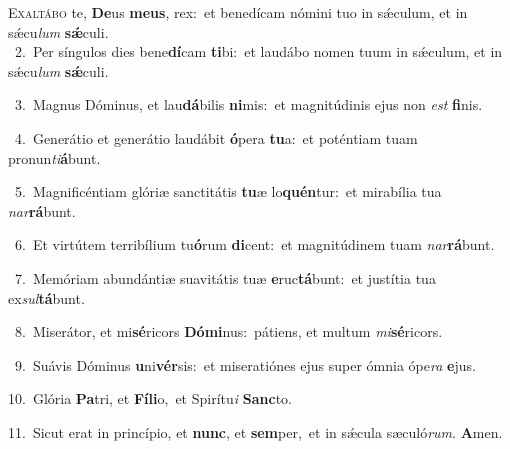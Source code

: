 \lettrine{\initial\textcolor{\initialcolor}{E}}{xaltábo} te, \textbf{De}\-us \textbf{me}\-\textbf{us}, rex:~\star et benedícam nómini tuo in sǽculum, et in sǽcu\textit{lum} \textbf{sǽ}\-culi.\\
{\numbfont\textcolor{\numbcolor}{~2.}}~Per síngulos dies bene\-\textbf{dí}\-cam \textbf{ti}\-bi:~\star et laudábo nomen tuum in sǽculum, et in sǽcu\textit{lum} \textbf{sǽ}\-culi.\par
{\numbfont\textcolor{\numbcolor}{~3.}}~Magnus Dóminus, et lau\-\textbf{dá}\-bilis \textbf{ni}\-mis:~\star et magnitúdinis ejus non \textit{est} \textbf{fi}\-nis.\par
{\numbfont\textcolor{\numbcolor}{~4.}}~Generátio et generátio laudábit \textbf{ó}\-pera \textbf{tu}\-a:~\star et poténtiam tuam pronun\-\textit{ti}\-\textbf{á}bunt.\par
{\numbfont\textcolor{\numbcolor}{~5.}}~Magnificéntiam glóriæ sanctitátis \textbf{tu}\-æ lo\-\textbf{quén}\-tur:~\star et mirabília tua \textit{nar}\-\textbf{rá}bunt.\par
{\numbfont\textcolor{\numbcolor}{~6.}}~Et virtútem terribílium tu\-\textbf{ó}\-rum \textbf{di}\-cent:~\star et magnitúdinem tuam \textit{nar}\-\textbf{rá}bunt.\par
{\numbfont\textcolor{\numbcolor}{~7.}}~Memóriam abundántiæ suavitátis tuæ \textbf{e}\-ruc\-\textbf{tá}\-bunt:~\star et justítia tua ex\-\textit{sul}\-\textbf{tá}bunt.\par
{\numbfont\textcolor{\numbcolor}{~8.}}~Miserátor, et mi\-\textbf{sé}\-ricors \textbf{Dó}\-\textbf{mi}nus:~\star pátiens, et multum \textit{mi}\-\textbf{sé}ricors.\par
{\numbfont\textcolor{\numbcolor}{~9.}}~Suávis Dóminus \textbf{u}\-ni\-\textbf{vér}\-sis:~\star et miseratiónes ejus super ómnia ópe\textit{ra} \textbf{e}\-jus.\par
{\numbfont\textcolor{\numbcolor}{10.}}~Glória \textbf{Pa}\-tri, et \textbf{Fí}\-\textbf{li}o,~\star et Spirítu\textit{i} \textbf{Sanc}\-to.\par
{\numbfont\textcolor{\numbcolor}{11.}}~Sicut erat in princípio, et \textbf{nunc}\-, et \textbf{sem}\-per,~\star et in sǽcula sæculó\-\textit{rum}\-. \textbf{A}\-men.\par
